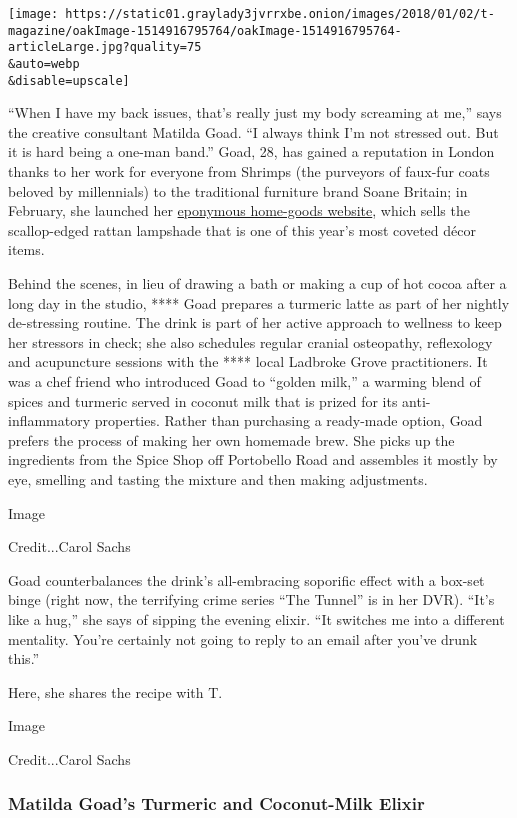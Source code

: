 \texttt{[image: https://static01.graylady3jvrrxbe.onion/images/2018/01/02/t-magazine/oakImage-1514916795764/oakImage-1514916795764-articleLarge.jpg?quality=75\\\&auto=webp\\\&disable=upscale]}

``When I have my back issues, that's really just my body screaming at
me,'' says the creative consultant Matilda Goad. ``I always think I'm
not stressed out. But it is hard being a one-man band.'' Goad, 28, has
gained a reputation in London thanks to her work for everyone from
Shrimps (the purveyors of faux-fur coats beloved by millennials) to the
traditional furniture brand Soane Britain; in February, she launched her
\href{http://matildagoad.com/}{eponymous home-goods website}, which
sells the scallop-edged rattan lampshade that is one of this year's most
coveted décor items.

Behind the scenes, in lieu of drawing a bath or making a cup of hot
cocoa after a long day in the studio, **** Goad prepares a turmeric
latte as part of her nightly de-stressing routine. The drink is part of
her active approach to wellness to keep her stressors in check; she also
schedules regular cranial osteopathy, reflexology and acupuncture
sessions with the **** local Ladbroke Grove practitioners. It was a chef
friend who introduced Goad to ``golden milk,'' a warming blend of spices
and turmeric served in coconut milk that is prized for its
anti-inflammatory properties. Rather than purchasing a ready-made
option, Goad prefers the process of making her own homemade brew. She
picks up the ingredients from the Spice Shop off Portobello Road and
assembles it mostly by eye, smelling and tasting the mixture and then
making adjustments.

Image

Credit...Carol Sachs

Goad counterbalances the drink's all-embracing soporific effect with a
box-set binge (right now, the terrifying crime series ``The Tunnel'' is
in her DVR). ``It's like a hug,'' she says of sipping the evening
elixir. ``It switches me into a different mentality. You're certainly
not going to reply to an email after you've drunk this.''

Here, she shares the recipe with T.

Image

Credit...Carol Sachs

\hypertarget{matilda-goads-turmeric-and-coconut-milk-elixir}{%
\subsubsection{Matilda Goad's Turmeric and Coconut-Milk
Elixir}\label{matilda-goads-turmeric-and-coconut-milk-elixir}}

